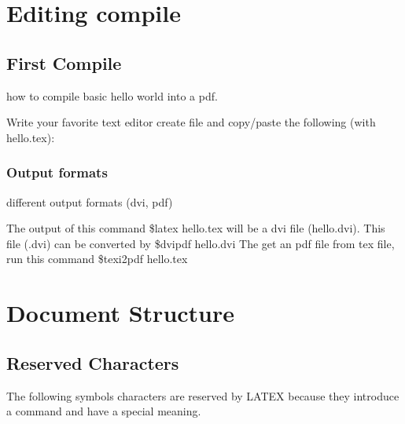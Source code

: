 \documentclass{report}
\begin{document}
 
\tableofcontents{}
 
\chapter{Editing compile}
 
\section{First Compile}
 
how to compile basic hello world into a pdf.
 
Write your favorite text editor create file and copy/paste the following (with hello.tex):
 
\subsection{Output formats}
 
different output formats (dvi, pdf)
 
The output of this command \$latex hello.tex will be a dvi 
file (hello.dvi). This file (.dvi) can be converted by \$dvipdf 
hello.dvi The get an pdf file from tex file, run this 
command \$texi2pdf hello.tex
 
\chapter{Document Structure}
 
\section{Reserved Characters}
 
The following symbols characters are reserved by LATEX because 
they introduce a command and have a special meaning.
 
\end{document}
